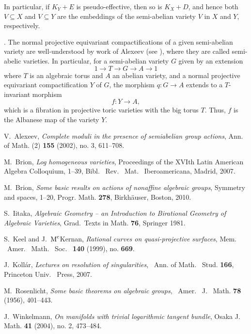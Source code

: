 \documentclass[12pt,a4paper]{amsart}
\theoremstyle{plain}
\theoremstyle{definition}
\theoremstyle{remark}
\begin{document}
In particular, if $K_Y + E$ is pseudo-effective, then so is $K_X + D$,
and hence both $V \subseteq X$ and $V \subseteq Y$ are the embeddings
of the semi-abelian variety $V$ in $X$ and $Y$, respectively.

\medskip

. The normal projective equivariant compactifications of a
given semi-abelian variety are well-understood by work of
Alexeev (see \cite{Al02}), where they are called semi-abelic varieties.
In particular, for a semi-abelian variety $G$ given by an extension
$$ 1 \to T \to G \to A \to 1$$
where $T$ is an algebraic torus and $A$ an abelian
variety, and a normal projective equivariant compactification $Y$ of $G$,
the morphism $q : G \to A$ extends to a $T$-invariant morphism
\[ f : Y \longrightarrow A, \]
which is a fibration in projective toric varieties with the big torus $T$.
Thus, $f$ is the Albanese map of the variety $Y$.

\begin{thebibliography}{99}

V.~Alexeev,
\emph{Complete moduli in the presence of semiabelian group actions},
Ann. of Math. (2) \textbf{155} (2002), no. 3, 611--708.

M.~Brion,
\emph{Log homogeneous varieties},
Proceedings of the XVIth Latin American Algebra Colloquium, 1--39,
Bibl. \ Rev. \ Mat. \ Iberoamericana, Madrid, 2007.

M.~Brion,
\emph{Some basic results on actions of nonaffine algebraic groups},
Symmetry and spaces, 1--20,
Progr. Math. \textbf{278}, Birkh\"auser, Boston, 2010.

S.~Iitaka,
\emph{Algebraic Geometry --
an Introduction to Birational Geometry of
Algebraic Varieties},
Grad.\ Texts in Math. \textbf{76}, Springer 1981.

S.~Keel and J.~$\text{M}^{\text c}$Kernan,
\emph{Rational curves on quasi-projective surfaces},
Mem. \ Amer. \ Math. \ Soc. \  \textbf{140} (1999), no. \textbf{669}.

J.~Koll\'ar,
\emph{Lectures on resolution of singularities},
\ Ann. of Math. \ Stud. \textbf{166}, Princeton Univ. \ Press, 2007.

M.~Rosenlicht,
\emph{Some basic theorems on algebraic groups},
\ Amer. \ J. \ Math. \textbf{78} (1956), 401--443.

J.~Winkelmann,
\emph{On manifolds with trivial logarithmic tangent bundle},
Osaka J. Math. \textbf{41} (2004), no. 2, 473--484.

\end{thebibliography}
\end{document}
